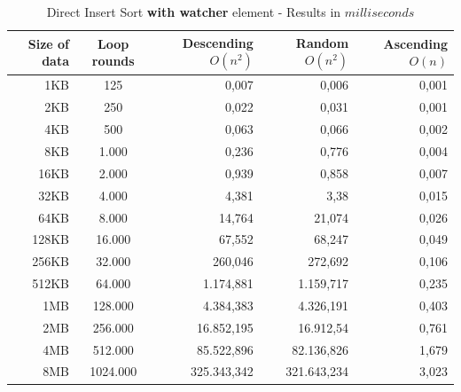 \documentclass[11pt]{amsart}
\begin{document}
\begin{table}[htdp]
	\caption{Direct Insert Sort \textbf{with watcher} element - Results in $milliseconds$}
	\begin{tabular}{|r|c|r|r|r|} \hline
		Size of data & Loop rounds & \parbox[c]{3.5cm}{Descending \\ $O(n^2)$} & \parbox[c]{3.5cm}{Random \\$O(n^2)$} & \parbox[c]{3.5cm}{Ascending \\ $O(n)$} \\ \hline
		1KB & 125 & 0,007 & 0,006 & 0,001 \\ \hline
		2KB & 250 & 0,022 & 0,031 & 0,001 \\ \hline
		4KB & 500 & 0,063 & 0,066 & 0,002 \\ \hline
		8KB & 1.000 & 0,236 & 0,776 & 0,004 \\ \hline
		16KB & 2.000 & 0,939 & 0,858 & 0,007 \\ \hline
		32KB & 4.000 & 4,381 & 3,38 & 0,015 \\ \hline
		64KB & 8.000 & 14,764 & 21,074 & 0,026 \\ \hline
		128KB & 16.000 & 67,552 & 68,247 & 0,049 \\ \hline
		256KB & 32.000 & 260,046 & 272,692 & 0,106 \\ \hline
		512KB & 64.000 & 1.174,881 & 1.159,717 & 0,235 \\ \hline
		1MB & 128.000 & 4.384,383 & 4.326,191 & 0,403 \\ \hline
		2MB & 256.000 & 16.852,195 & 16.912,54 & 0,761 \\ \hline
		4MB & 512.000 & 85.522,896 & 82.136,826 & 1,679 \\ \hline
		8MB & 1024.000 & 325.343,342 & 321.643,234 & 3,023 \\ \hline
	\end{tabular}
	\label{default}
\end{table}%
\end{document}

